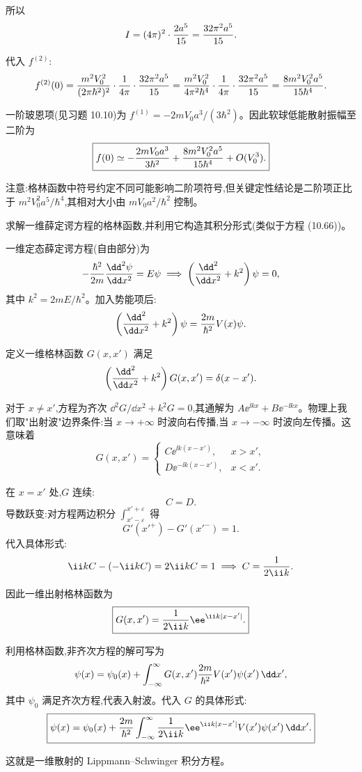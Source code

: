 \begin{question}
\begin{solution}
所以
\[
I=(4\pi)^2\cdot{2a^5\over15}={32\pi^2 a^5\over15}.
\]

代入 $f^{(2)}$:
\[
f^{(2)}(0)={m^2V_0^2\over(2\pi\hbar^2)^2}\cdot{1\over4\pi}\cdot{32\pi^2 a^5\over15}
={m^2V_0^2\over4\pi^2\hbar^4}\cdot{1\over4\pi}\cdot{32\pi^2 a^5\over15}
={8m^2V_0^2a^5\over15\hbar^4}.
\]

一阶玻恩项(见习题 10.10)为 $f^{(1)}=-2mV_0a^3/(3\hbar^2)$。因此软球低能散射振幅至二阶为
\[
\boxed{f(0)\simeq-{2mV_0a^3\over3\hbar^2}+{8m^2V_0^2a^5\over15\hbar^4}+O(V_0^3).}
\]

注意:格林函数中符号约定不同可能影响二阶项符号,但关键定性结论是二阶项正比于 $m^2V_0^2a^5/\hbar^4$,其相对大小由 $mV_0a^2/\hbar^2$ 控制。
\end{solution}
\end{question}

\begin{question}
求解一维薛定谔方程的格林函数,并利用它构造其积分形式(类似于方程 (10.66))。

\par\smallskip
{}

\begin{solution}
一维定态薛定谔方程(自由部分)为
\[
-{\hbar^2\over2m}{\dd^2\psi\over\dd x^2}=E\psi
\;\Longrightarrow\;
\left({\dd^2\over\dd x^2}+k^2\right)\psi=0,
\]
其中 $k^2=2mE/\hbar^2$。加入势能项后:
\[
\left({\dd^2\over\dd x^2}+k^2\right)\psi={2m\over\hbar^2}V(x)\psi.
\]

定义一维格林函数 $G(x,x')$ 满足
\[
\left({\dd^2\over\dd x^2}+k^2\right)G(x,x')=\delta(x-x').
\]

对于 $x\neq x'$,方程为齐次 $\dd^2G/\dd x^2+k^2G=0$,其通解为 $A\ee^{\ii kx}+B\ee^{-\ii kx}$。物理上我们取"出射波"边界条件:当 $x\to+\infty$ 时波向右传播,当 $x\to-\infty$ 时波向左传播。这意味着
\[
G(x,x')=\begin{cases}
C \ee^{\ii k(x-x')}, & x>x',\\
D \ee^{-\ii k(x-x')}, & x<x'.
\end{cases}
\]

在 $x=x'$ 处,$G$ 连续:
\[
C=D.
\]
导数跃变:对方程两边积分 $\int_{x'-\varepsilon}^{x'+\varepsilon}$ 得
\[
G'(x'^+)-G'(x'^-)=1.
\]
代入具体形式:
\[
\ii k C-(-\ii k C)=2\ii k C=1\;\Longrightarrow\;C={1\over2\ii k}.
\]

因此一维出射格林函数为
\[
\boxed{G(x,x')={1\over2\ii k}\ee^{\ii k|x-x'|}.}
\]

利用格林函数,非齐次方程的解可写为
\[
\psi(x)=\psi_0(x)+\int_{-\infty}^{\infty}G(x,x'){2m\over\hbar^2}V(x')\psi(x')\,\dd x',
\]
其中 $\psi_0$ 满足齐次方程,代表入射波。代入 $G$ 的具体形式:
\[
\boxed{\psi(x)=\psi_0(x)+{2m\over\hbar^2}\int_{-\infty}^{\infty}{1\over2\ii k}\ee^{\ii k|x-x'|}V(x')\psi(x')\,\dd x'.}
\]

这就是一维散射的 Lippmann--Schwinger 积分方程。
\end{solution}
\end{question}

